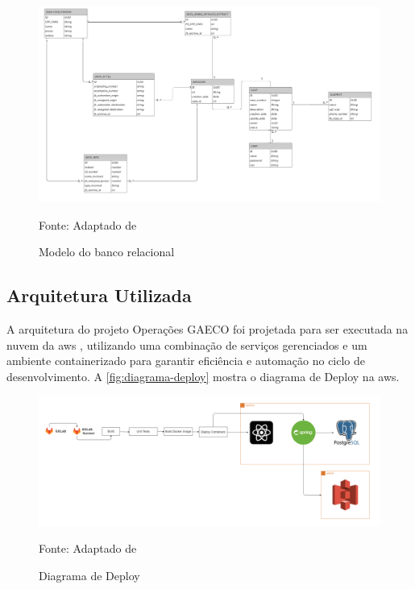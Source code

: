  \begin{figure}[H]
    \centering
    \small
    \includegraphics[width=1\linewidth]{conteudo//2 - ages I//conteudo//figures//banco-postgresql.jpeg}
    \caption{Modelo do banco relacional}
    Fonte: Adaptado de \textcites{wiki-vincula}
    \label{fig:modelo-banco}
  \end{figure}

\newpage
\subsection{Arquitetura Utilizada}
  A arquitetura do projeto Operações GAECO foi projetada para ser executada na nuvem da \ac{aws} \cite{aws}, utilizando uma combinação de serviços gerenciados e um ambiente containerizado para garantir eficiência e automação no ciclo de desenvolvimento. A \autoref{fig:diagrama-deploy} mostra o diagrama de Deploy na \acs{aws}.

  \begin{figure}[H]
    \centering
    \small
    \includegraphics[width=1\linewidth]{conteudo//2 - ages I//conteudo//figures//Diagrama_de_Deploy.png}
    \caption{Diagrama de Deploy}
    Fonte: Adaptado de \textcites{wiki-Operacoes GAECO}
    \label{fig:diagrama-deploy}
  \end{figure}


